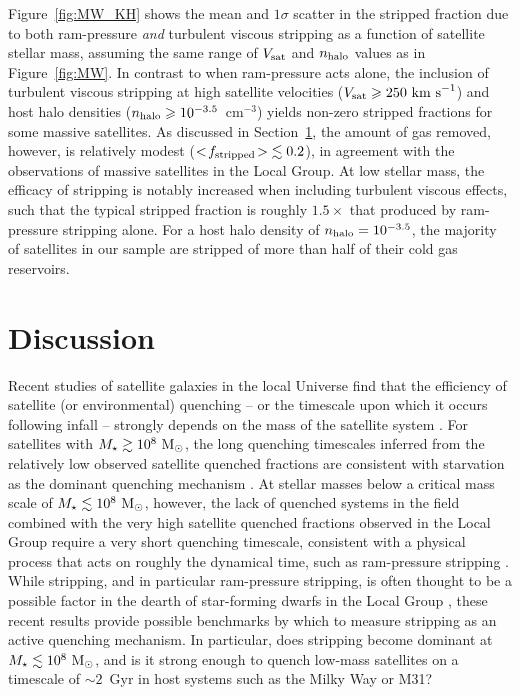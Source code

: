 \documentclass[usenatbib]{mn2e}
\newcommand{\mstar}{{M}_{\star}}
\newcommand{\msun}{{\rm M}_{\odot}}
\begin{document}
Figure~\ref{fig:MW_KH} shows the mean and $1\sigma$ scatter in the
stripped fraction due to both ram-pressure \emph{and} turbulent
viscous stripping as a function of satellite stellar mass, assuming
the same range of $V_{\rm sat}$ and $n_{\rm halo}$ values as in
Figure~\ref{fig:MW}.
%
In contrast to when ram-pressure acts alone, the inclusion of
turbulent viscous stripping at high satellite velocities ($V_{\rm sat}
\ge 250~{\rm km~s}^{-1}$) and host halo densities ($n_{\rm halo} \ge
10^{-3.5}$~cm$^{-3}$) yields non-zero stripped fractions for some
massive satellites.
%
As discussed in Section~\ref{sec:disc}, the amount of gas removed,
however, is relatively modest ($< \! f_{\rm stripped} \! > \; \lesssim
0.2$), in agreement with the observations of massive satellites in the
Local Group. 
%
At low stellar mass, the efficacy of stripping is notably increased
when including turbulent viscous effects, such that the typical
stripped fraction is roughly $1.5\times$ that produced by ram-pressure
stripping alone.
%
For a host halo density of $n_{\rm halo} = 10^{-3.5}$, the majority of
satellites in our sample are stripped of more than half of their cold
gas reservoirs. 



\section{Discussion}
\label{sec:disc}


Recent studies of satellite galaxies in the local Universe find that
the efficiency of satellite (or environmental) quenching -- or the
timescale upon which it occurs following infall -- strongly depends on
the mass of the satellite system \citep{delucia12, wetzel13,
  wetzel15b, wheeler14, fham15}. For satellites with $\mstar \gtrsim
10^{8}~\msun$, the long quenching timescales inferred from the
relatively low observed satellite quenched fractions are consistent
with starvation as the dominant quenching mechanism \citep[][see also
\citealt{davies16}]{fham15}.
%
At stellar masses below a critical mass scale of $\mstar \lesssim
10^{8}~\msun$, however, the lack of quenched systems in the field
combined with the very high satellite quenched fractions observed in
the Local Group require a very short quenching timescale, consistent
with a physical process that acts on roughly the dynamical time, such
as ram-pressure stripping \citep{wetzel15b, fham15}. 
%
While stripping, and in particular ram-pressure stripping, is often
thought to be a possible factor in the dearth of star-forming dwarfs
in the Local Group \citep{einasto74, lin83, blitz00}, these recent
results provide possible benchmarks by which to measure stripping as
an active quenching mechanism.
%
In particular, does stripping become dominant at $\mstar \lesssim
10^{8}~\msun$, and is it strong enough to quench low-mass satellites
on a timescale of $\sim2$~Gyr in host systems such as the Milky Way or
M31?
\end{document}

